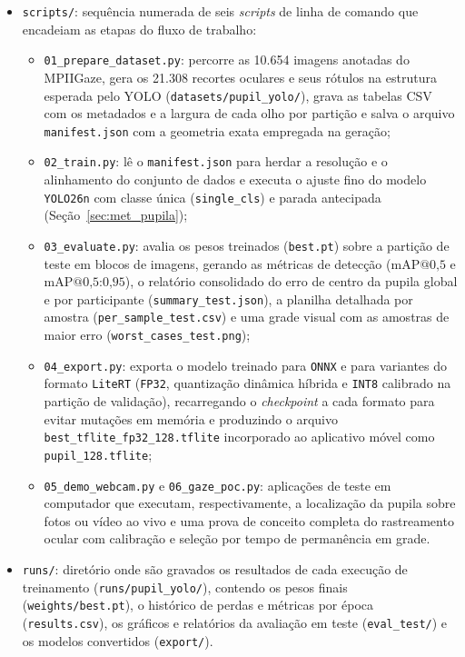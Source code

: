 \begin{itemize}
\begin{itemize}
        \item \texttt{facemesh.py}, \texttt{pupil.py} e \texttt{gaze.py}: implementam em Python a detecção dos cantos oculares via MediaPipe Tasks API, a inferência do centro da pupila no recorte e o ajuste polinomial do vetor pupila--canto (Equações~\ref{eq:vetor_pupila_canto} e~\ref{eq:regressao_polinomial}).
    \end{itemize}
    \item \texttt{scripts/}: sequência numerada de seis \textit{scripts} de linha de comando que encadeiam as etapas do fluxo de trabalho:
    \begin{itemize}
        \item \texttt{01\_prepare\_dataset.py}: percorre as 10.654 imagens anotadas do MPIIGaze, gera os 21.308 recortes oculares e seus rótulos na estrutura esperada pelo YOLO (\texttt{datasets/pupil\_yolo/}), grava as tabelas CSV com os metadados e a largura de cada olho por partição e salva o arquivo \texttt{manifest.json} com a geometria exata empregada na geração;
        \item \texttt{02\_train.py}: lê o \texttt{manifest.json} para herdar a resolução e o alinhamento do conjunto de dados e executa o ajuste fino do modelo \texttt{YOLO26n} com classe única (\texttt{single\_cls}) e parada antecipada (Seção~\ref{sec:met_pupila});
        \item \texttt{03\_evaluate.py}: avalia os pesos treinados (\texttt{best.pt}) sobre a partição de teste em blocos de imagens, gerando as métricas de detecção ($\text{mAP@0,5}$ e $\text{mAP@0,5:0,95}$), o relatório consolidado do erro de centro da pupila global e por participante (\texttt{summary\_test.json}), a planilha detalhada por amostra (\texttt{per\_sample\_test.csv}) e uma grade visual com as amostras de maior erro (\texttt{worst\_cases\_test.png});
        \item \texttt{04\_export.py}: exporta o modelo treinado para \texttt{ONNX} e para variantes do formato \texttt{LiteRT} (\texttt{FP32}, quantização dinâmica híbrida e \texttt{INT8} calibrado na partição de validação), recarregando o \textit{checkpoint} a cada formato para evitar mutações em memória e produzindo o arquivo \texttt{best\_\allowbreak tflite\_\allowbreak fp32\_\allowbreak 128.tflite} incorporado ao aplicativo móvel como \texttt{pupil\_128.tflite};
        \item \texttt{05\_demo\_webcam.py} e \texttt{06\_gaze\_poc.py}: aplicações de teste em computador que executam, respectivamente, a localização da pupila sobre fotos ou vídeo ao vivo e uma prova de conceito completa do rastreamento ocular com calibração e seleção por tempo de permanência em grade.
    \end{itemize}
    \item \texttt{runs/}: diretório onde são gravados os resultados de cada execução de treinamento (\texttt{runs/pupil\_yolo/}), contendo os pesos finais (\texttt{weights/best.pt}), o histórico de perdas e métricas por época (\texttt{results.csv}), os gráficos e relatórios da avaliação em teste (\texttt{eval\_test/}) e os modelos convertidos (\texttt{export/}).
\end{itemize}
